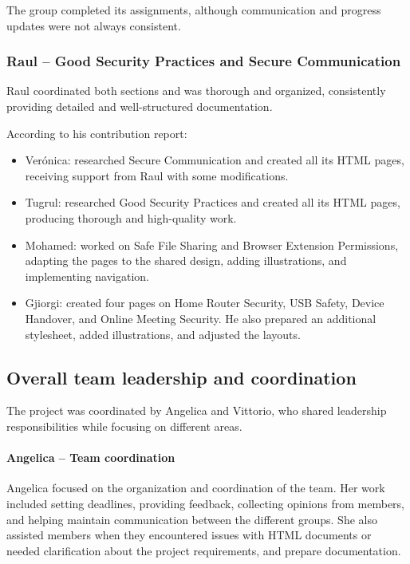 The group completed its assignments, although communication and progress updates were not always consistent.

\subsubsection{Raul -- Good Security Practices and Secure Communication}
\label{sec:raul}

Raul coordinated both sections and was thorough and organized, consistently providing detailed and well-structured documentation.

According to his contribution report:

\begin{itemize}
    \item Verónica: researched Secure Communication and created all its HTML pages, receiving support from Raul with some modifications.
    \item Tugrul: researched Good Security Practices and created all its HTML pages, producing thorough and high-quality work.
    \item Mohamed: worked on Safe File Sharing and Browser Extension Permissions, adapting the pages to the shared design, adding illustrations, and implementing navigation.
    \item Gjiorgi: created four pages on Home Router Security, USB Safety, Device Handover, and Online Meeting Security. He also prepared an additional stylesheet, added illustrations, and adjusted the layouts.
\end{itemize}

\subsection{Overall team leadership and coordination}
\label{sec:leadership}

The project was coordinated by Angelica and Vittorio, who shared leadership responsibilities while focusing on different areas.

\paragraph{Angelica -- Team coordination}

Angelica focused on the organization and coordination of the team. Her work included setting deadlines, providing feedback, collecting opinions from members, and helping maintain communication between the different groups.
She also assisted members when they encountered issues with HTML documents or needed clarification about the project requirements, and prepare documentation.

